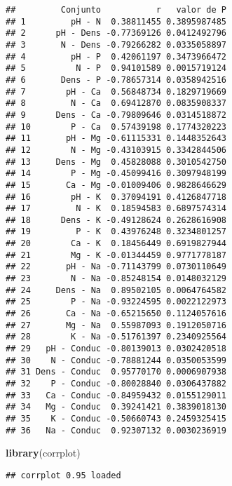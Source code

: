 \documentclass[
]{article}
\newenvironment{Shaded}{\begin{snugshade}}{\end{snugshade}}
\newcommand{\FunctionTok}[1]{\textcolor[rgb]{0.13,0.29,0.53}{\textbf{#1}}}
\newcommand{\NormalTok}[1]{#1}
\begin{document}
\begin{verbatim}
##         Conjunto           r   valor de P
## 1         pH - N  0.38811455 0.3895987485
## 2      pH - Dens -0.77369126 0.0412492796
## 3       N - Dens -0.79266282 0.0335058897
## 4         pH - P  0.42061197 0.3473966472
## 5          N - P  0.94101589 0.0015719124
## 6       Dens - P -0.78657314 0.0358942516
## 7        pH - Ca  0.56848734 0.1829719669
## 8         N - Ca  0.69412870 0.0835908337
## 9      Dens - Ca -0.79809646 0.0314518872
## 10        P - Ca  0.57439198 0.1774320223
## 11       pH - Mg -0.61115331 0.1448352643
## 12        N - Mg -0.43103915 0.3342844506
## 13     Dens - Mg  0.45828088 0.3010542750
## 14        P - Mg -0.45099416 0.3097948199
## 15       Ca - Mg -0.01009406 0.9828646629
## 16        pH - K  0.37094191 0.4126847718
## 17         N - K  0.18594583 0.6897574314
## 18      Dens - K -0.49128624 0.2628616908
## 19         P - K  0.43976248 0.3234801257
## 20        Ca - K  0.18456449 0.6919827944
## 21        Mg - K -0.01344459 0.9771778187
## 22       pH - Na -0.71143799 0.0730110649
## 23        N - Na -0.85248154 0.0148032129
## 24     Dens - Na  0.89502105 0.0064764582
## 25        P - Na -0.93224595 0.0022122973
## 26       Ca - Na -0.65215650 0.1124057616
## 27       Mg - Na  0.55987093 0.1912050716
## 28        K - Na -0.51761397 0.2340925564
## 29   pH - Conduc -0.80139013 0.0302420518
## 30    N - Conduc -0.78881244 0.0350053599
## 31 Dens - Conduc  0.95770170 0.0006907938
## 32    P - Conduc -0.80028840 0.0306437882
## 33   Ca - Conduc -0.84959432 0.0155129011
## 34   Mg - Conduc  0.39241421 0.3839018130
## 35    K - Conduc -0.50660743 0.2459325415
## 36   Na - Conduc  0.92307132 0.0030236919
\end{verbatim}

\begin{Shaded}
\begin{Highlighting}[]
\FunctionTok{library}\NormalTok{(corrplot)}
\end{Highlighting}
\end{Shaded}

\begin{verbatim}
## corrplot 0.95 loaded
\end{verbatim}
\end{document}
